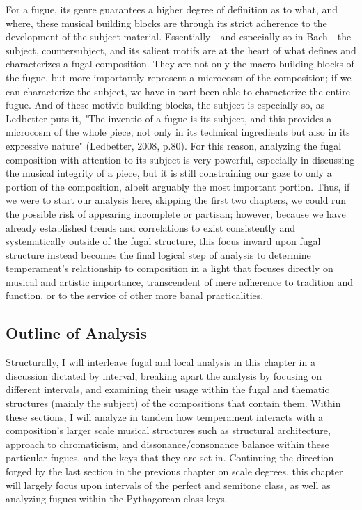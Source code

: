 For a fugue, its genre guarantees a higher degree of definition as to
what, and where, these musical building blocks are through its strict
adherence to the development of the subject material.
Essentially---and especially so in Bach---the subject,
countersubject, and its salient motifs are at the heart of what defines
and characterizes a fugal composition. They are not only the macro
building blocks of the fugue, but more importantly represent a microcosm
of the composition; if we can characterize the subject, we have in part
been able to characterize the entire fugue. And of these motivic
building blocks, the subject is especially so, as Ledbetter puts it,
"The inventio of a fugue is its subject, and this provides a microcosm
of the whole piece, not only in its technical ingredients but also in
its expressive nature" (Ledbetter, 2008, p.80). For this reason,
analyzing the fugal composition with attention to its subject is very
powerful, especially in discussing the musical integrity of a piece, but
it is still constraining our gaze to only a portion of the composition,
albeit arguably the most important portion. Thus, if we were to start
our analysis here, skipping the first two chapters, we could run the
possible risk of appearing incomplete or partisan; however, because we
have already established trends and correlations to exist consistently
and systematically outside of the fugal structure, this focus inward
upon fugal structure instead becomes the final logical step of analysis
to determine temperament's relationship to composition in a light that
focuses directly on musical and artistic importance, transcendent of
mere adherence to tradition and function, or to the service of other
more banal practicalities.

\subsection{Outline of Analysis}\label{outline-of-analysis}

Structurally, I will interleave fugal and local analysis in this chapter
in a discussion dictated by interval, breaking apart the analysis by
focusing on different intervals, and examining their usage within the
fugal and thematic structures (mainly the subject) of the compositions
that contain them. Within these sections, I will analyze in tandem how
temperament interacts with a composition's larger scale musical
structures such as structural architecture, approach to chromaticism,
and dissonance/consonance balance within these particular fugues, and
the keys that they are set in. Continuing the direction forged by the
last section in the previous chapter on scale degrees, this chapter will
largely focus upon intervals of the perfect and semitone class, as well
as analyzing fugues within the Pythagorean class keys.

